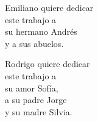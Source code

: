 
\begin{dedication} 

Emiliano quiere dedicar \\ 
este trabajo a \\
su hermano Andr\'es \\
y a sus abuelos. 

\vspace{1cm}

Rodrigo quiere dedicar \\ 
este trabajo a \\
su amor Sof\'ia,\\ 
a su padre Jorge\\ 
y su madre Silvia. 


\end{dedication}

